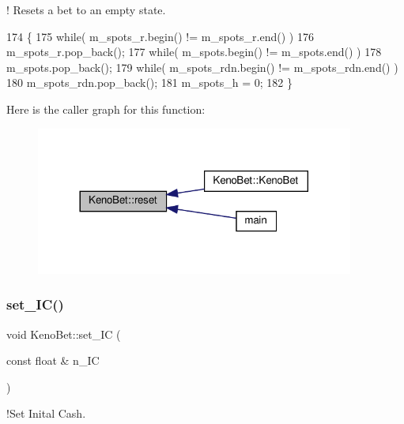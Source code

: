 ! Resets a bet to an empty state. 


\begin{DoxyCode}
174 \{   
175     \textcolor{keywordflow}{while}( m\_spots\_r.begin() != m\_spots\_r.end() )
176         m\_spots\_r.pop\_back();
177     \textcolor{keywordflow}{while}( m\_spots.begin() != m\_spots.end() )
178         m\_spots.pop\_back();
179     \textcolor{keywordflow}{while}( m\_spots\_rdn.begin() != m\_spots\_rdn.end() )
180         m\_spots\_rdn.pop\_back();
181     m\_spots\_h = 0;
182 \}
\end{DoxyCode}
Here is the caller graph for this function\+:
\nopagebreak
\begin{figure}[H]
\begin{center}
\leavevmode
\includegraphics[width=296pt]{classKenoBet_acc2afd4d502e44fdfbb122f3389bc633_icgraph}
\end{center}
\end{figure}
\mbox{\label{classKenoBet_a7b74641d226e6b2ea45bc60889f32781}} 
\subsubsection{\texorpdfstring{set\+\_\+\+I\+C()}{set\_IC()}}
{\footnotesize\ttfamily void Keno\+Bet\+::set\+\_\+\+IC (\begin{DoxyParamCaption}\item[{const float \&}]{n\+\_\+\+IC }\end{DoxyParamCaption})}



!\+Set Inital Cash. 


